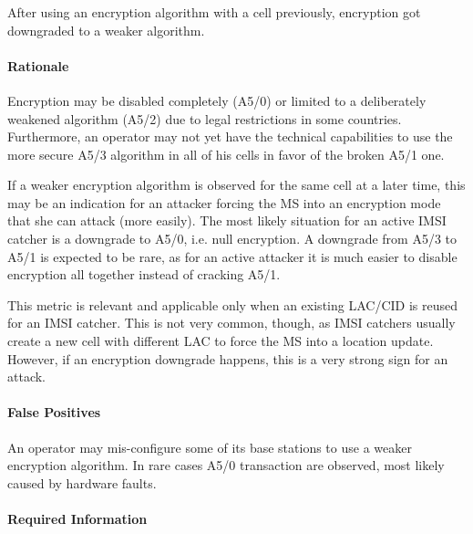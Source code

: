 \documentclass[a4paper,11pt,notitlepage,bigheadings,oneside]{scrartcl}
\begin{document}
\subsubsection{}

After using an encryption algorithm with a cell previously, encryption got
downgraded to a weaker algorithm.

\paragraph{Rationale}

Encryption may be disabled completely (A5/0) or limited to a deliberately
weakened algorithm (A5/2) due to legal restrictions in some countries.
Furthermore, an operator may not yet have the technical capabilities to use the
more secure A5/3 algorithm in all of his cells in favor of the broken A5/1 one.

If a weaker encryption algorithm is observed for the same cell at a later time,
this may be an indication for an attacker forcing the MS into an encryption
mode that she can attack (more easily). The most likely situation for an active
IMSI catcher is a downgrade to A5/0, i.e. null encryption. A downgrade from
A5/3 to A5/1 is expected to be rare, as for an active attacker it is much
easier to disable encryption all together instead of cracking A5/1.

This metric is relevant and applicable only when an existing LAC/CID is reused
for an IMSI catcher. This is not very common, though, as IMSI catchers usually
create a new cell with different LAC to force the MS into a location update.
However, if an encryption downgrade happens, this is a very strong sign for an
attack.

\paragraph{False Positives}

An operator may mis-configure some of its base stations to use a weaker
encryption algorithm. In rare cases A5/0 transaction are observed, most likely
caused by hardware faults.


\paragraph{Required Information}
\end{document}
